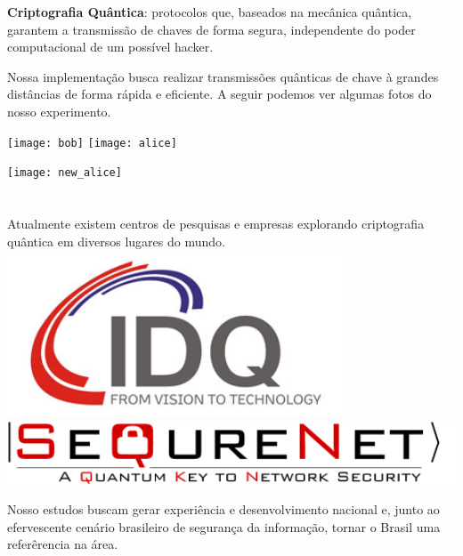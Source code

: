 \documentclass{sciposter}
\newcommand{\tituloA}[1]{\emph{\textbf{\color{white}{#1}}}}
\begin{document}
\begin{multicols*}{2}
{\vspace{1cm}
\textbf{Criptografia Quântica}: protocolos que, baseados na mecânica quântica, garantem a transmissão de chaves de forma segura, independente do poder computacional de um possível hacker.

\vspace{1cm}
\par Nossa implementação busca realizar transmissões quânticas de chave à grandes distâncias de forma rápida e eficiente. A seguir podemos ver algumas fotos do nosso experimento.

\vspace{1cm}
\hspace{1cm}
\texttt{[image: bob]}
\hspace{0.5cm}
\texttt{[image: alice]}

\vspace{1cm}
\hspace{8.75cm}
\texttt{[image: new\_alice]}



\section*{\tituloA{\color{white}{\Large{Ao Infinito e Além!}}}}

\par Atualmente existem centros de pesquisas e empresas explorando criptografia quântica em diversos lugares do mundo.\\

\hspace{4cm}
\vspace{2cm}
\includegraphics[width=10cm]{idq}
\hspace{4cm}
\vspace{-4cm}
\includegraphics[width=15cm]{sequrenet}\\

\vspace{2cm}
\par Nosso estudos buscam gerar experiência e desenvolvimento nacional e, junto ao efervescente cenário brasileiro de segurança da informação, tornar o Brasil uma referêrencia na área.


}
\end{multicols*}
\end{document}
